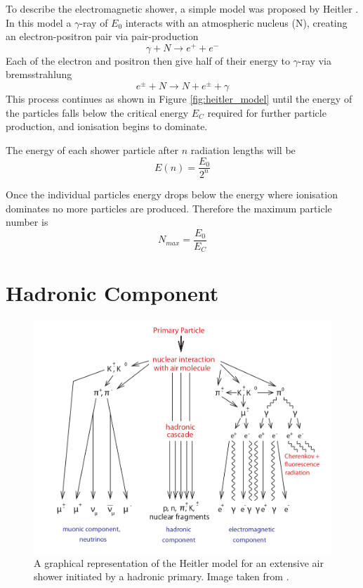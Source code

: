 To describe the electromagnetic shower, a simple model was proposed by Heitler \cite{Heitler}. In this model a $\gamma$-ray of $E_0$ interacts with an atmospheric nucleus (N), creating an electron-positron pair via pair-production
\begin{equation}
\gamma + N \rightarrow e^+ + e^- 
\end{equation}
Each of the electron and positron then give half of their energy to $\gamma$-ray via bremsstrahlung
\begin{equation}
e^{\pm} + N \rightarrow N + e^{\pm} + \gamma
\end{equation}
This process continues as shown in Figure \ref{fig:heitler_model} until the energy of the particles falls below the critical energy $E_C$ required for further particle production, and ionisation begins to dominate.

The energy of each shower particle after $n$ radiation lengths will be
\begin{equation}
E(n) = \frac{E_0}{2^n}
\end{equation}

Once the individual particles energy drops below the energy where ionisation dominates no more particles are produced. Therefore the maximum particle number is
\begin{equation}
N_{max} = \frac{E_0}{E_C}
\end{equation}

\section{Hadronic Component}

\begin{figure}[htbp]
\includegraphics[width=\textwidth]{chapters/pictures/hielter_model_hadronic.png}
\caption{A graphical representation of the Heitler model for an extensive air shower initiated by a hadronic primary. Image taken from \cite{0034-4885-66-7-202}.}
\end{figure}

